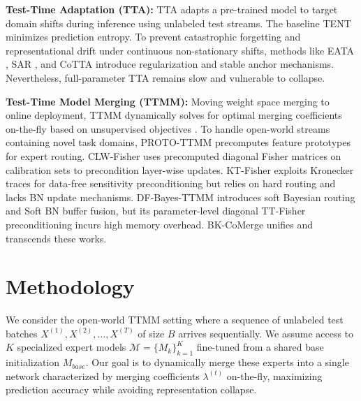 \documentclass{article}
\theoremstyle{plain}
\theoremstyle{definition}
\theoremstyle{remark}
\begin{document}
\textbf{Test-Time Adaptation (TTA):} TTA adapts a pre-trained model to target domain shifts during inference using unlabeled test streams. The baseline TENT \cite{wang2021tent} minimizes prediction entropy. To prevent catastrophic forgetting and representational drift under continuous non-stationary shifts, methods like EATA \cite{niu2022eata}, SAR \cite{niu2023sar}, and CoTTA \cite{wang2022cotta} introduce regularization and stable anchor mechanisms. Nevertheless, full-parameter TTA remains slow and vulnerable to collapse.

\textbf{Test-Time Model Merging (TTMM):} Moving weight space merging to online deployment, TTMM dynamically solves for optimal merging coefficients on-the-fly based on unsupervised objectives \cite{yang2024adamerging, hubotter2025fisher}. To handle open-world streams containing novel task domains, PROTO-TTMM \cite{zhao2024proto} precomputes feature prototypes for expert routing. CLW-Fisher uses precomputed diagonal Fisher matrices on calibration sets to precondition layer-wise updates. KT-Fisher exploits Kronecker traces for data-free sensitivity preconditioning but relies on hard routing and lacks BN update mechanisms. DF-Bayes-TTMM introduces soft Bayesian routing and Soft BN buffer fusion, but its parameter-level diagonal TT-Fisher preconditioning incurs high memory overhead. BK-CoMerge unifies and transcends these works.

\section{Methodology}
\label{sec:method}

We consider the open-world TTMM setting where a sequence of unlabeled test batches $X^{(1)}, X^{(2)}, \dots, X^{(T)}$ of size $B$ arrives sequentially. We assume access to $K$ specialized expert models $\mathcal{M} = \{M_k\}_{k=1}^K$ fine-tuned from a shared base initialization $M_{base}$. Our goal is to dynamically merge these experts into a single network characterized by merging coefficients $\lambda^{(t)}$ on-the-fly, maximizing prediction accuracy while avoiding representation collapse.
\end{document}
